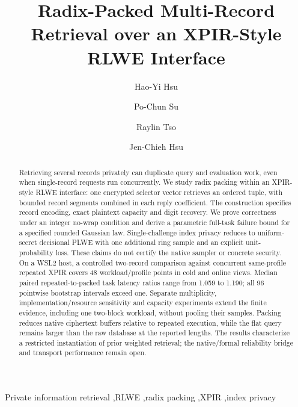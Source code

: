 \documentclass[preprint,11pt]{elsarticle}
\begin{document}
\begin{frontmatter}
\title{Radix-Packed Multi-Record Retrieval over an XPIR-Style RLWE Interface}
\author[nccu]{Hao-Yi Hsu}
\author[nccu]{Po-Chun Su}
\author[nccu]{Raylin Tso}
\author[nccu]{Jen-Chieh Hsu}
\begin{abstract}

Retrieving several records privately can duplicate query and evaluation
work, even when single-record requests run concurrently. We study radix
packing within an XPIR-style RLWE interface: one encrypted selector
vector retrieves an ordered tuple, with bounded record segments combined
in each reply coefficient. The construction specifies record encoding,
exact plaintext capacity and digit recovery. We prove correctness under
an integer no-wrap condition and derive a parametric full-task failure
bound for a specified rounded Gaussian law. Single-challenge index privacy
reduces to uniform-secret decisional PLWE with one additional ring sample
and an explicit unit-probability loss. These claims do not certify the
native sampler or concrete security. On a WSL2 host, a controlled
two-record comparison against concurrent same-profile repeated XPIR covers
48 workload/profile points in cold and online views. Median paired
repeated-to-packed task latency ratios range from 1.059 to 1.190; all 96
pointwise bootstrap intervals exceed one. Separate multiplicity,
implementation/resource sensitivity and capacity experiments extend the
finite evidence, including one two-block workload, without pooling their
samples. Packing reduces native ciphertext buffers relative to repeated
execution, while the flat query remains larger than the raw database at
the reported lengths. The results characterize a restricted instantiation
of prior weighted retrieval; the native/formal reliability bridge and
transport performance remain open.

\end{abstract}
\begin{keyword}
Private information retrieval \sep RLWE \sep radix packing \sep XPIR \sep index privacy
\end{keyword}
\end{frontmatter}
\raggedbottom









\setlength{\bibsep}{1pt}


\appendix

\end{document}
